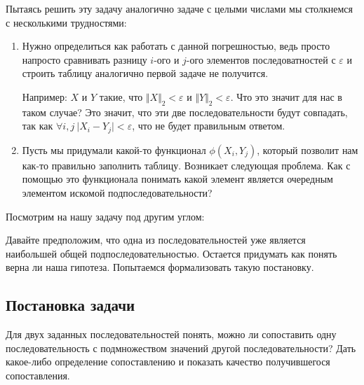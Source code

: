 \documentclass[12pt]{article}
\begin{document}
Пытаясь решить эту задачу аналогично задаче с целыми числами
мы столкнемся с несколькими трудностями:
\begin{enumerate}
    \item Нужно определиться как работать с данной погрешностью, ведь просто напросто
    сравнивать разницу $i$-ого и $j$-ого элементов последоватностей с $\varepsilon$
    и строить таблицу аналогично первой задаче не получится.

    Например: $X$ и $Y$ такие, что
    $\Vert X \Vert_2 < \varepsilon$ и $\Vert Y \Vert_2 < \varepsilon$.
    Что это значит для нас в таком случае?
    Это значит, что эти две последовательности будут совпадать,
    так как $\forall i, j\ \vert X_i - Y_j\vert < \varepsilon$, что
    не будет правильным ответом.
    \item Пусть мы придумали какой-то функционал $\phi(X_i, Y_j)$,
    который позволит нам как-то правильно заполнить таблицу.
    Возникает следующая проблема. Как с помощью это функционала
    понимать какой элемент является очередным элементом искомой
    подпоследовательности?
\end{enumerate}

Посмотрим на нашу задачу под другим углом:

Давайте предположим, что одна из последовательностей
уже является наибольшей общей подпоследовательностью.
Остается придумать как понять верна ли наша гипотеза.
Попытаемся формализовать такую постановку.

\subsection{Постановка задачи}
    Для двух заданных последовательностей понять, можно ли сопоставить
    одну последовательность с подмножеством значений другой последовательности?
    Дать какое-либо определение сопоставлению и показать качество
    получившегося сопоставления.
\end{document}
